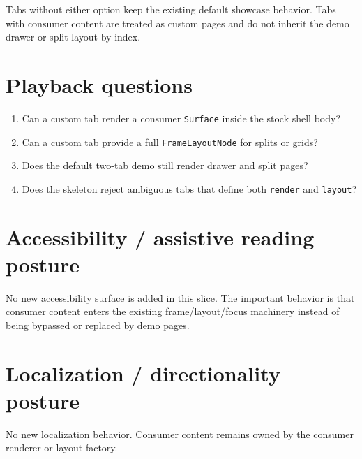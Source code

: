 Tabs without either option keep the existing default showcase behavior. Tabs with consumer content are treated as custom pages and do not inherit the demo drawer or split layout by index.

\section{Playback questions}\label{record-130-playback-questions}

\begin{enumerate}
\def\labelenumi{\arabic{enumi}.}
\tightlist
\item
  Can a custom tab render a consumer \texttt{S\allowbreak{}u\allowbreak{}r\allowbreak{}f\allowbreak{}a\allowbreak{}c\allowbreak{}e} inside the stock shell body?
\item
  Can a custom tab provide a full \texttt{F\allowbreak{}r\allowbreak{}a\allowbreak{}m\allowbreak{}e\allowbreak{}L\allowbreak{}a\allowbreak{}y\allowbreak{}o\allowbreak{}u\allowbreak{}t\allowbreak{}N\allowbreak{}o\allowbreak{}d\allowbreak{}e} for splits or grids?
\item
  Does the default two-tab demo still render drawer and split pages?
\item
  Does the skeleton reject ambiguous tabs that define both \texttt{r\allowbreak{}e\allowbreak{}n\allowbreak{}d\allowbreak{}e\allowbreak{}r} and \texttt{l\allowbreak{}a\allowbreak{}y\allowbreak{}o\allowbreak{}u\allowbreak{}t}?
\end{enumerate}

\section{Accessibility / assistive reading posture}\label{record-130-accessibility-assistive-reading-posture}

No new accessibility surface is added in this slice. The important behavior is that consumer content enters the existing frame/layout/focus machinery instead of being bypassed or replaced by demo pages.

\section{Localization / directionality posture}\label{record-130-localization-directionality-posture}

No new localization behavior. Consumer content remains owned by the consumer renderer or layout factory.

